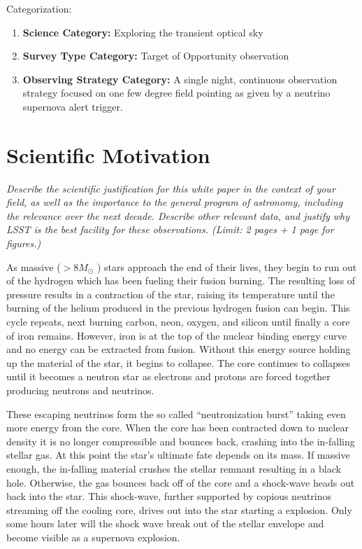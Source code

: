 \documentclass[11pt]{article}
\begin{document}
\noindent
Categorization: 
\begin{enumerate} 
\item {\bf Science Category:}  Exploring the transient optical sky
\item {\bf Survey Type Category:}  Target of Opportunity observation
\item {\bf Observing Strategy Category:}  A single night, continuous
  observation strategy focused on one few degree field pointing as given by
  a neutrino supernova alert trigger.
\end{enumerate}  

\clearpage

\section{Scientific Motivation}

\begin{footnotesize}
{\it Describe the scientific justification for this white paper in the context
of your field, as well as the importance to the general program of astronomy, 
including the relevance over the next decade. 
Describe other relevant data, and justify why LSST is the best facility for these observations.
(Limit: 2 pages + 1 page for figures.)}
\end{footnotesize}

\vspace{.6in}

As massive ($ > 8 M_\odot$ ) stars approach the end of their lives,
they begin to run out of the hydrogen which has been fueling their
fusion burning.  The resulting loss of pressure results in a
contraction of the star, raising its temperature until the burning of
the helium produced in the previous hydrogen fusion can begin. This
cycle repeats, next burning carbon, neon, oxygen, and silicon until
finally a core of iron remains.  However, iron is at the top of the
nuclear binding energy curve and no energy can be extracted from
fusion.  Without this energy source holding up the material of the
star, it begins to collapse.  The core continues to collapses until it
becomes a neutron star as electrons and protons are forced together
producing neutrons and neutrinos.

These escaping neutrinos form the so called ``neutronization burst''
taking even more energy from the core.  When the core has been
contracted down to nuclear density it is no longer compressible and
bounces back, crashing into the in-falling stellar gas. At this point
the star's ultimate fate depends on its mass.  If massive enough, the
in-falling material crushes the stellar remnant resulting in a black
hole.  Otherwise, the gas bounces back off of the core and a
shock-wave heads out back into the star.  This shock-wave, further
supported by copious neutrinos streaming off the cooling core, drives
out into the star starting a explosion.  Only some hours later will
the shock wave break out of the stellar envelope and become visible as
a supernova explosion.
\end{document}
